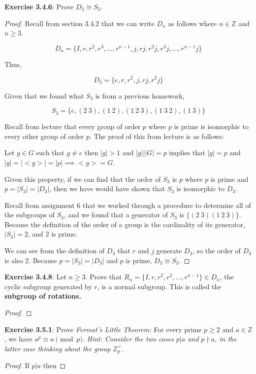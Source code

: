 \documentclass[a4paper]{article}
\begin{document}
\begin{myparindent}{0pt}
\textbf{Exercise 3.4.6}:
Prove $D_3 \cong S_3$.
\begin{proof}
  Recall from section 3.4.2 that we can write $D_n$ as follows where
  $n \in \mathbb{Z}$ and $n \ge 3$.

  \[ D_n = \{I, r, r^2, r^3,..., r^{n-1},j,rj, r^2 j, r^3 j,..., r^{n-1} j \} \]

  Thus,

  \[ D_3 = \{ e, r, r^2, j, rj, r^2j \} \]

  Given that we found what $S_3$ is from a previous homework,

  \[ S_3 = \{ e, (2 ~3), (1 ~2), (1 ~2 ~3), (1 ~3 ~2), (1 ~3) \} \]

  Recall from lecture that every group of order $p$ where $p$ is prime is
  isomorphic to every other group of order $p$. The proof of this from lecture
  is as follows:

  Let $g \in G$ such that $g \neq e$ then $|g| > 1$ and $|g| \vert |G| = p$
  implies that $|g| = p$ and $|g| = |<g>| = |p| \implies <g> = G$. \newline

  Given this property, if we can find that the order of $S_3$ is $p$ where $p$
  is prime and $p = |S_3| = |D_3|$, then we have would have shown that $S_3$ is
  isomorphic to $D_3$. \newline

  Recall from assignment 6 that we worked through a
  procedure to determine all of the subgroups of $S_3$, and we found that a
  generator of $S_3$ is $\{ (2 ~3) (1 ~2 ~3)\}$. Because the definition of the
  order of a group is the cardinality of its generator, $|S_3| = 2$, and 2 is
  prime.
  \newline

  We can see from the definition of $D_3$ that $r$ and $j$ generate $D_3$, so
  the order of $D_3$ is also 2. Because $p = |S_3| = |D_3|$ and $p$ is prime,
  $D_3 \cong S_3$.

\end{proof}

\textbf{Exercise 3.4.8}:
Let $n \ge 3$. Prove that $R_n = \{ I, r, r^2, r^3, ..., r^{n - 1} \} \in D_n$,
the cyclic subgroup generated by $r$, is a normal subgroup. This is called the
\textbf{subgroup of rotations.}
\begin{proof}
\end{proof}

\textbf{Exercise 3.5.1}:
Prove \textit{Fermat's Little Theorem:} For every prime $p \ge 2$ and
$a \in \mathbb{Z}$, we have $a^p \equiv a \pmod p$. \textit{Hint: Consider the
two cases $p|a$ and $p \nmid a$, in the latter case thinking about the group
$\mathbb{Z}_p^{\times}$}.
\begin{proof}
  If $p | a$ then


\end{proof}
\end{myparindent}
\end{document}
